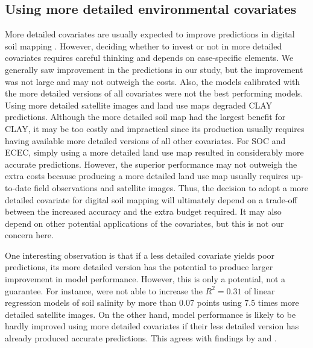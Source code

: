 \subsection{Using more detailed environmental covariates}

More detailed covariates are usually expected to improve predictions in digital soil mapping 
\cite{CavazziEtAl2013, MaynardEtAl2014}. However, deciding whether to invest or not in more detailed 
covariates requires careful thinking and depends on case-specific elements. We generally saw improvement in 
the predictions in our study, but the improvement was not large and may not outweigh the costs. Also, the 
models calibrated with the more detailed versions of all covariates were not the best performing models. Using 
more detailed satellite images and land use maps degraded CLAY predictions. Although the more detailed
soil map had the largest benefit for CLAY, it may be too costly and impractical since its production usually 
requires having available more detailed versions of all other covariates. For SOC and ECEC, simply using a more 
detailed land use map resulted in considerably more accurate predictions. However, the superior performance may 
not outweigh the extra costs because producing a more detailed land use map usually requires up-to-date field 
observations and satellite images. Thus, the decision to adopt a more detailed covariate for digital soil 
mapping will ultimately depend on a trade-off between the increased accuracy and the extra budget required. It 
may also depend on other potential applications of the covariates, but this is not our concern here.

One interesting observation is that if a less detailed covariate yields poor predictions, its more detailed 
version has the potential to produce larger improvement in model performance. However, this is only a 
potential, not a guarantee. For instance,  were not able to increase the $R^2 = 
0.31$ of linear regression models of soil salinity by more than 0.07 points using 7.5 times more detailed 
satellite images. On the other hand, model performance is likely to be hardly improved using more detailed 
covariates if their less detailed version has already produced accurate predictions. This agrees with findings 
by  and .

